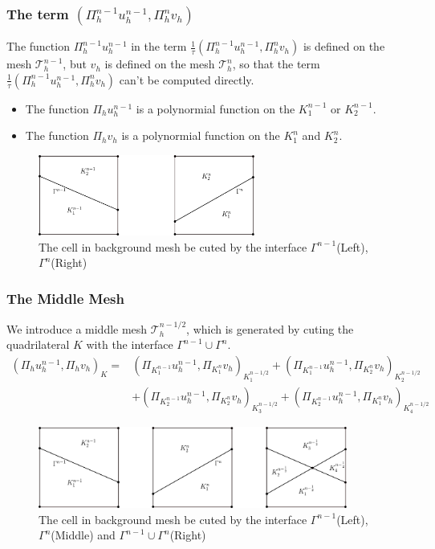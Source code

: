 \documentclass[notheorems,serif]{beamer}
\begin{document}
\begin{CJK}{UTF8}{gkai}
\begin{frame}
    \frametitle{The term $(\Pi_h^{n-1} u_h^{n-1},\Pi_h^n v_h)$}
The function $\Pi_h^{n-1} u^{n-1}_h$ 
in the term $\frac{1}{\tau}( \Pi_h^{n-1} u_h^{n-1}, \Pi_h^n v_h)$ 
is defined on the mesh $\mathcal{T}_h^{n-1}$, but $v_h$ is defined on the
mesh $\mathcal{T}_h^n$, so that the term 
$\frac{1}{\tau}( \Pi_h^{n-1} u_h^{n-1}, \Pi_h^n v_h)$
can't be computed directly. 
\begin{itemize}
    \item The function $\Pi_h u_h^{n-1}$ is a polynormial function on the
        $K_1^{n-1}$ or $K_2^{n-1}$. 
    \item The function $\Pi_h v_h$ is a polynormial function on the $K_1^n$ and
        $K_2^n$.
\end{itemize}

\begin{figure}[h]
    \centering
    \includegraphics[width=2.8in]{../figures/movingmaxwell/backcell_be_cuted.pdf}
    \caption{\small The cell in background mesh be cuted by the interface $\Gamma^{n-1}$(Left),
    $\Gamma^n$(Right)} 
     \label{fig:overlapmesh} %
\end{figure}

\end{frame}


\begin{frame}
    \frametitle{The Middle Mesh}
We introduce a middle mesh $\mathcal{T}_h^{n-1/2}$, which is
generated by cuting the quadrilateral $K$ with the interface $\Gamma^{n-1}\cup\Gamma^n$.
$$
\begin{aligned}
    (\Pi_h u_h^{n-1}, \Pi_h v_h)_K = 
    &
    (\Pi_{K_1^{n-1}}u_h^{n-1}, \Pi_{K_1^{n}}v_h)_{K_1^{n-1/2}} 
    +
    (\Pi_{K_1^{n-1}}u_h^{n-1}, \Pi_{K_2^{n}}v_h)_{K_2^{n-1/2}}\\ 
    & +
    (\Pi_{K_2^{n-1}}u_h^{n-1}, \Pi_{K_2^{n}}v_h)_{K_3^{n-1/2}} 
    +
    (\Pi_{K_2^{n-1}}u_h^{n-1}, \Pi_{K_1^{n}}v_h)_{K_4^{n-1/2}} 
\end{aligned}
$$

\begin{figure}[h]
    \centering
    \includegraphics[width=4in]{../figures/movingmaxwell/overlap_interface.pdf}
    \caption{\small The cell in background mesh be cuted by the interface $\Gamma^{n-1}$(Left),
    $\Gamma^n$(Middle) and $\Gamma^{n-1} \cup \Gamma^n$(Right)}
     \label{fig:overlapmesh} %
\end{figure}
\end{frame}


\end{CJK}
\end{document}
